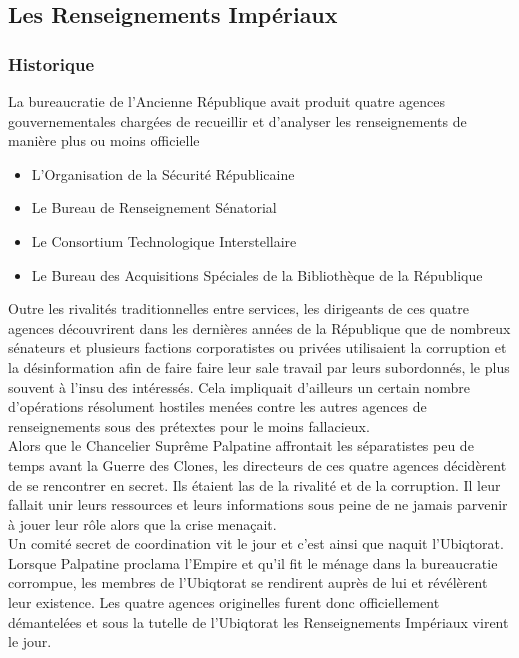 \documentclass[twoside]{article}
\begin{document}
\subsection{Les Renseignements Impériaux}
\subsubsection{Historique}
La bureaucratie de l'Ancienne République avait produit quatre agences gouvernementales chargées de recueillir et d'analyser les renseignements de manière plus ou moins officielle
\begin{itemize}
	\item L'Organisation de la Sécurité Républicaine
	\item Le Bureau de Renseignement Sénatorial
	\item Le Consortium Technologique Interstellaire
	\item Le Bureau des Acquisitions Spéciales de la Bibliothèque de la République 
\end{itemize}

Outre les rivalités traditionnelles entre services, les dirigeants de ces quatre agences découvrirent dans les dernières années de la République que de nombreux sénateurs et plusieurs factions corporatistes ou privées utilisaient la corruption et la désinformation afin de faire faire leur sale travail par leurs subordonnés, le plus souvent à l'insu des intéressés. Cela impliquait d'ailleurs un certain nombre d'opérations résolument hostiles menées contre les autres agences de renseignements sous des prétextes pour le moins fallacieux.\\

Alors que le Chancelier Suprême Palpatine affrontait les séparatistes peu de temps avant la Guerre des Clones, les directeurs de ces quatre agences décidèrent de se rencontrer en secret. Ils étaient las de la rivalité et de la corruption. Il leur fallait unir leurs ressources et leurs informations sous peine de ne jamais parvenir à jouer leur rôle alors que la crise menaçait.\\

Un comité secret de coordination vit le jour et c'est ainsi que naquit l'Ubiqtorat. Lorsque Palpatine proclama l'Empire et qu'il fit le ménage dans la bureaucratie corrompue, les membres de l'Ubiqtorat se rendirent auprès de lui et révélèrent leur existence. Les quatre agences originelles furent donc officiellement démantelées et sous la tutelle de l'Ubiqtorat les Renseignements Impériaux virent le jour.
\end{document}
